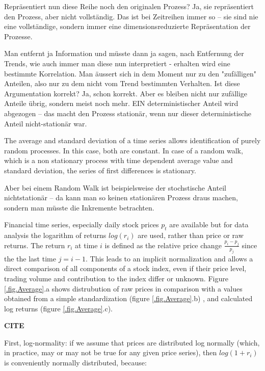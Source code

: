 \documentclass[a4paper,10pt]{scrbook}
\begin{document}
Repräsentiert nun diese Reihe noch den originalen Prozess?
Ja, sie repräsentiert den Prozess, aber nicht vollständig.  Das ist bei
Zeitreihen immer so -- sie sind nie eine vollständige, sondern immer eine
dimensionsreduzierte Repräsentation der Prozesse.

Man entfernt ja Information und müsste dann ja sagen, nach Entfernung der
Trends, wie auch immer man diese nun interpretiert - erhalten wird eine
bestimmte Korrelation. Man äussert sich in dem Moment nur zu den
"zufälligen" Anteilen, also nur zu dem nicht vom Trend bestimmten
Verhalten. Ist diese Argumentation korrekt?
Ja, schon korrekt.  Aber es bleiben nicht nur zufällige Anteile übrig,
sondern meist noch mehr.  EIN deterministischer Anteil wird abgezogen --
das macht den Prozess stationär, wenn nur dieser deterministische Anteil
nicht-stationär war. 

The average and standard deviation of a time series allows identification of purely random processes. In this case, both are constant. In case of a random walk, which is a non stationary process with time dependent average value and standard deviation, the series of first differences is stationary. 

Aber bei einem Random Walk ist beispielsweise der
stochstische Anteil nichtstationär -- da kann man so keinen stationären
Prozess draus machen, sondern man müsste die Inkremente betrachten.

\label{ext.fig.Average} 
%


Financial time series, especially daily stock prices $p_t$ are available but for data analysis the logarithm of returns $log( r_i )$ are used, rather than price or raw returns. The return $r_i$ at time $i$ is defined as the relative price change $\frac{p_i-p_j}{p_j}$ since the the last time $j=i-1$. This leads to an implicit normalization and allows a direct comparison of all components of a stock index, even if their price level, trading volume and contribution to the index differ or unknown. Figure \ref{.fig.Average}.a shows distrubution of raw prices in comparison with a values obtained from a simple standardization (figure \ref{.fig.Average}.b) , and calculated log returns (figure \ref{.fig.Average}.c).


\textbf{CITE}


First, log-normality: if we assume that prices are distributed log normally (which, in practice, may or may not be true for any given price series), then $log(1 + r_i)$ is conveniently normally distributed, because:
\end{document}
